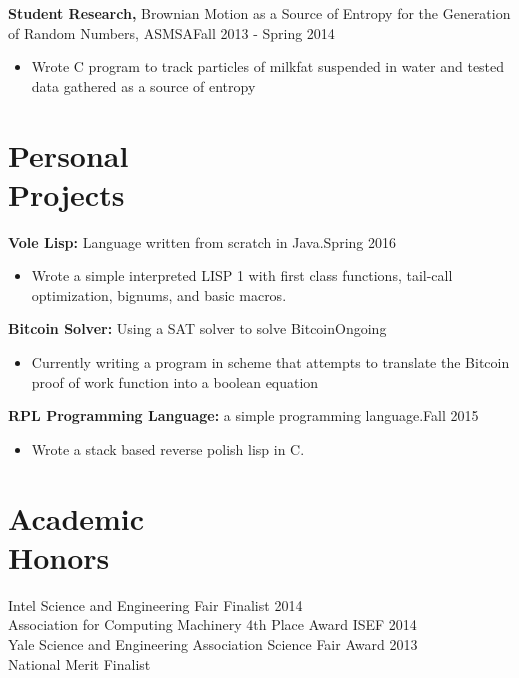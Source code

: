 \documentclass[margin]{res}
\begin{document}
\begin{resume}
{\bf Student Research,} Brownian Motion as a Source of Entropy for the Generation of Random Numbers, ASMSA\hfill  Fall 2013 - Spring 2014
\begin{itemize} \itemsep -2pt %
\item Wrote C program to track particles of milkfat suspended in water and tested data gathered as a source of entropy
\end{itemize}
 
%
%

\section{Personal\\Projects}

{\bf Vole Lisp:} Language written from scratch in Java.\hfill  Spring 2016
\begin{itemize} \itemsep -2pt %
\item Wrote a simple interpreted LISP 1 with first class functions, tail-call optimization, bignums, and basic macros.
\end{itemize}

{\bf Bitcoin Solver:} Using a SAT solver to solve Bitcoin\hfill  Ongoing
\begin{itemize} \itemsep -2pt %
\item Currently writing a program in scheme that attempts to translate the Bitcoin proof of work function into a boolean equation
\end{itemize}

{\bf RPL Programming Language:} a simple programming language.\hfill  Fall 2015
\begin{itemize} \itemsep -2pt %
\item Wrote a stack based reverse polish lisp in C.
\end{itemize}



\section{Academic \\ Honors} 
Intel Science and Engineering Fair Finalist 2014\\
Association for Computing Machinery 4th Place Award ISEF 2014\\
Yale Science and Engineering Association Science Fair Award 2013 \\
National Merit Finalist \\
 


\end{resume}
\end{document}
